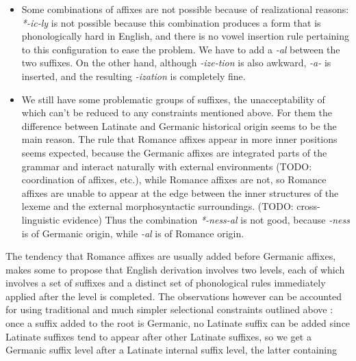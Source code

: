 \documentclass[UTF8, a4paper, oneside, scheme=plain, 12pt]{ctexbook}
\newcommand{\form}[1]{\emph{#1}}
\begin{document}
\begin{itemize}
    \item Some combinations of affixes are not possible because of realizational reasons:
    \form{*-ic-ly} is not possible 
    because this combination produces a form 
    that is phonologically hard in English,
    and there is no vowel insertion rule pertaining to this configuration to ease the problem.
    We have to add a \form{-al} between the two suffixes.
    On the other hand, although \form{-ize-tion} is also awkward,
    \form{-a-} is inserted, and the resulting \form{-ization} is completely fine.
    \item We still have some problematic groups of suffixes,
    the unacceptability of which can't be reduced to any constraints mentioned above.
    For them the difference
    between Latinate and Germanic historical origin 
    seems to be the main reason.
    The rule that Romance affixes appear in more inner positions seems expected,
    because the Germanic affixes are integrated parts of the grammar 
    and interact naturally with external environments
    (TODO: coordination of affixes, etc.),
    while Romance affixes are not,
    so Romance affixes are unable to appear at the edge 
    between the inner structures of the lexeme and the external morphosyntactic surroundings.
    (TODO: cross-linguistic evidence)
    Thus the combination \form{*-ness-al} is not good,
    because \form{-ness} is of Germanic origin,
    while \form{-al} is of Romance origin.
\end{itemize}

The tendency that Romance affixes are usually added before Germanic affixes,
makes some to propose that English derivation 
involves two levels, 
each of which involves a set of suffixes 
and a distinct set of phonological rules immediately applied after the level is completed.
The observations however can be accounted for 
using traditional and much simpler selectional constraints outlined above \citep{fabb1988english}:
once a suffix added to the root is Germanic,
no Latinate suffix can be added 
since Latinate suffixes tend to appear after other Latinate suffixes,
so we get a Germanic suffix level after a Latinate internal suffix level,
the latter containing 
\end{document}
